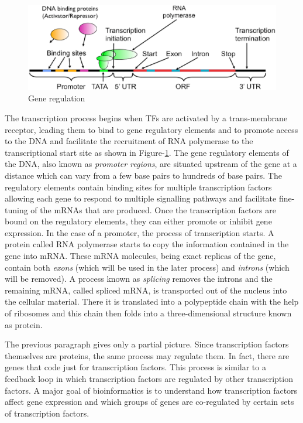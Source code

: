 \begin{figure}[ht]
 \centering
 \includegraphics[scale=0.6]{introduction/gene_regulation.eps}
 \caption{Gene regulation}
 \label{fig:gene_regulation}
\end{figure}
The transcription process begins when \acp{TF} are activated by a trans-membrane receptor, leading them to bind to gene regulatory elements and to promote access to the DNA and facilitate the recruitment of RNA polymerase to the transcriptional start site as shown in Figure-\ref{fig:gene_regulation}. The gene regulatory elements of the DNA, also known as \textit{promoter regions}, are situated upstream of the gene at a distance which can vary from a few base pairs to hundreds of base pairs. The regulatory elements contain binding sites for multiple transcription factors allowing each gene to respond to multiple signalling pathways and facilitate fine-tuning of the \acp{mRNA} that are produced. Once the transcription factors are bound on the regulatory elements, they can either promote or inhibit gene expression. In the case of a promoter, the process of transcription starts. A protein called RNA polymerase starts to copy the information contained in the gene into \ac{mRNA}. These \ac{mRNA} molecules, being exact replicas of the gene, contain both \textit{exons} (which will be used in the later process) and \textit{introns} (which will be removed). A process known as \textit{splicing} removes the introns and the remaining \ac{mRNA}, called spliced \ac{mRNA}, is transported out of the nucleus into the cellular material. There it is translated into a polypeptide chain with the help of ribosomes and this chain then folds into a three-dimensional structure known as protein. 

The previous paragraph gives only a partial picture. Since transcription factors themselves are proteins, the same process may regulate them. In fact, there are genes that code just for transcription factors. This process is similar to a feedback loop in which transcription factors are regulated by other transcription factors. A major goal of bioinformatics is to understand how transcription factors affect gene expression and which groups of genes are co-regulated by certain sets of transcription factors. 

